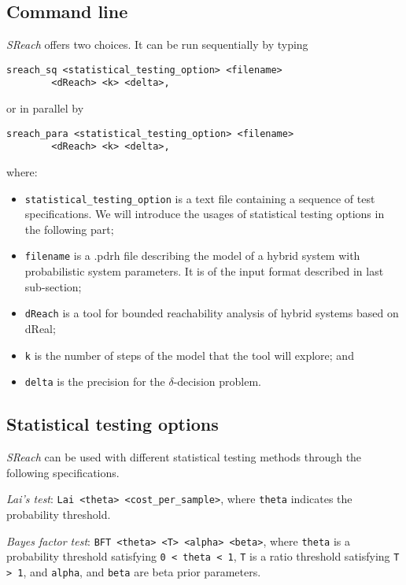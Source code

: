 \subsection{Command line}
{\it SReach} offers two choices. It can be run sequentially by typing
\vspace{-0.4cm}
\begin{verbatim} 
sreach_sq <statistical_testing_option> <filename> 
		<dReach> <k> <delta>,
\end{verbatim} 
\vspace{-0.4cm}
or in parallel by 
\vspace{-0.4cm}
\begin{verbatim} 
sreach_para <statistical_testing_option> <filename> 
		<dReach> <k> <delta>,
\end{verbatim} 
\vspace{-0.4cm}
where:
\begin{itemize}
\item \verb+statistical_testing_option+ is a text file containing a sequence of test specifications. We will introduce the usages of statistical testing options in the following part;
\item \verb+filename+ is a .pdrh file describing the model of a hybrid system with probabilistic system parameters. It is of the input format described in last sub-section;
\item \verb+dReach+ is a tool for bounded reachability analysis of hybrid systems based on dReal;
\item \verb+k+ is the number of steps of the model that the tool will explore; and
\item \verb+delta+ is the precision for the $\delta$-decision problem.
\end{itemize}

\subsection{Statistical testing options}

{\it SReach} can be used with different statistical testing methods through the following specifications.

\textit {Lai's test}: \verb+Lai <theta> <cost_per_sample>+, where \verb+theta+ indicates the probability threshold.
 
\textit {Bayes factor test}: \verb+BFT <theta> <T> <alpha> <beta>+,
where \verb+theta+ is a probability threshold satisfying \verb+0 < theta < 1+, \verb+T+ is a ratio threshold satisfying \verb+T > 1+, and \verb+alpha+, and \verb+beta+ are beta prior parameters.


